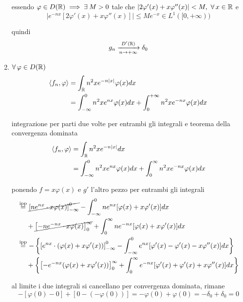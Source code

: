 \begin{enumerate}
essendo $\varphi \in D(\RR) \implies \exists M > 0$ tale che $| 2\varphi '(x) + x\varphi ''(x)| < M, \ \forall x\in \RR $ e
\begin{equation*}
\left| e^{- nx}[ 2\varphi '(x) + x\varphi ''(x)]\right| \leq Me^{- x} \in L^{1}([ 0, + \infty))
\end{equation*}

quindi
\begin{equation*}
g_{n}\xrightarrow[n\rightarrow + \infty ]{D'(\mathbb{R})} \delta_{0}
\end{equation*}
\item $\forall \varphi \in D(\RR)$
\begin{equation*}
\begin{aligned}
\langle f_{n}, \varphi \rangle & = \int_{\mathbb{R}} n^{2} xe^{- n| x|} \varphi (x) dx\\
 & = \int^{0}_{- \infty} n^{2} xe^{nx} \varphi (x) dx + \int^{+ \infty}_{0} n^{2} xe^{- nx} \varphi (x) dx
\end{aligned}
\end{equation*}

integrazione per parti due volte per entrambi gli integrali e teorema della convergenza dominata
\begin{align*}
\langle f_{n}, \varphi \rangle & = \int_{\mathbb{R}} n^{2} xe^{- n| x|} dx\\
 & = \int^{0}_{- \infty} n^{2} xe^{nx} \varphi (x) dx + \int^{\infty}_{0} n^{2} xe^{- nx} \varphi (x) dx
\end{align*}

ponendo $f = x\varphi (x)$ e $g'$ l'altro pezzo per entrambi gli integrali
\begin{align*}
 & \overset{\text{ipp}}{=}\cancel{\left[ ne^{nx} \cdot x\varphi (x)\right]^{0}_{- \infty}} - \int^{0}_{- \infty} ne^{nx}[ \varphi (x) + x\varphi '(x)] dx\\
 & \ \ \ \ + \cancel{\left[ - ne^{- nx} \cdot x\varphi (x)\right]^{\infty}_{0}} + \int^{\infty}_{0} ne^{- nx}[ \varphi (x) + x\varphi '(x)] dx\\
 & \overset{\text{ipp}}{=} - \left\{\left[ e^{nx} \cdot (\varphi (x) + x\varphi '(x))\right]^{0}_{- \infty} - \int^{0}_{- \infty} e^{nx}[ \varphi '(x) - \varphi '(x) - x\varphi ''(x)] dx\right\}\\
 & \ \ \ \ + \left\{\left[ - e^{- nx}(\varphi (x) + x\varphi '(x))\right]^{\infty}_{0} + \int^{\infty}_{0} e^{- nx}[ \varphi '(x) + \varphi '(x) + x\varphi ''(x)] dx\right\}
\end{align*}

al limite i due integrali si cancellano per convergenza dominata, rimane
\begin{equation*}
- [ \varphi (0) - 0] + [ 0 - (- \varphi (0))] = - \varphi (0) + \varphi (0) = - \delta_{0} + \delta_{0} = 0
\end{equation*}
\end{enumerate}
